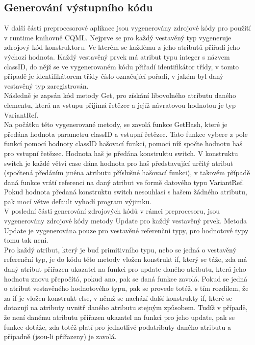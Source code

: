 \documentclass[report,11pt]{elsarticle}
\begin{document}
\subsection{Generování výstupního kódu}
V další části preprocesorové aplikace jsou vygenerovány zdrojové kódy pro použití v runtime knihovně CQML.
Nejprve se pro každý vestavěný typ vygeneruje zdrojový kód konstruktoru. Ve kterém se každému z jeho atributů přiřadí jeho výchozí hodnota. Každý vestavěný prvek má atribut typu integer s názvem classID, do nějž se ve vygenerovaném kódu přiřadí identifikátor třídy, v tomto případě je identifikátorem třídy číslo označující pořadí, v jakém byl daný vestavěný typ zaregistrován.\\
Následně je zapsán kód metody Get, pro získání libovolného atributu daného elementu, která na vstupu přijímá řetězec a jejíž návratovou hodnotou je typ VariantRef.\\
Na počátku této vygenerované metody, se zavolá funkce GetHash, které je předána hodnota parametru classID a vstupní řetězec. Tato funkce vybere z pole funkcí pomocí hodnoty classID hašovací funkcí, pomocí níž spočte hodnotu haš pro vstupní řetězec. Hodnota haš je předána konstruktu switch. V konstruktu switch je každé větvi case dána hodnota pro haš představující určitý atribut (spočtená předáním jména atributu příslušné hašovací funkci), v takovém případě daná funkce vrátí referenci na daný atribut ve formě datového typu VariantRef. Pokud hodnota předaná konstruktu switch nesouhlasí s hašem žádného atributu, pak mocí větve default vyhodí program výjimku.\\


V poslední části generování zdrojových kódů v rámci preprocesoru, jsou vygenerovány zdrojové kódy metody Update pro každý vestavěný prvek. Metoda Update je vygenerována pouze pro vestavěné referenční typy, pro hodnotové typy tomu tak není. \\
Pro každý atribut, který je buď primitivního typu, nebo se jedná o vestavěný referenční typ, je do kódu této metody vložen konstrukt if, který se táže, zda má daný atribut přiřazen ukazatel na funkci pro update daného atributu, která jeho hodnotu znovu přepočítá, pokud ano, pak se daná funkce zavolá.
Pokud se jedná o atribut vestavěného hodnotového typu, pak se provede totéž, s tím rozdílem, že za if je vložen konstrukt else, v němž se nachází další konstrukty if, které se dotazují na atributy uvnitř daného atributu stejným způsobem. Tudíž v případě, že není danému atributu přiřazen ukazatel na funkci pro jeho update, pak se funkce dotáže, zda totéž platí pro jednotlivé podatributy daného atributu a případně (jsou-li přiřazeny) je zavolá.\\
\end{document}
